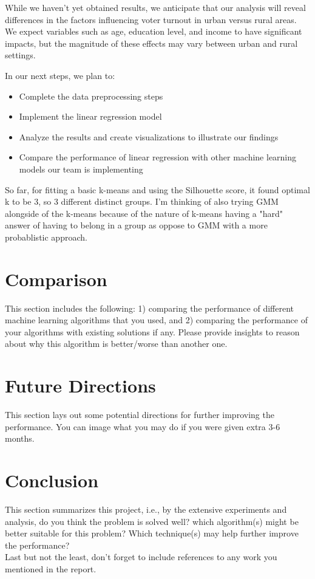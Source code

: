 \documentclass[conference]{IEEEtran}
\begin{document}
While we haven't yet obtained results, we anticipate that our analysis will reveal differences in the factors influencing voter turnout in urban versus rural areas. We expect variables such as age, education level, and income to have significant impacts, but the magnitude of these effects may vary between urban and rural settings.

In our next steps, we plan to:
\begin{itemize}
    \item Complete the data preprocessing steps
    \item Implement the linear regression model
    \item Analyze the results and create visualizations to illustrate our findings
    \item Compare the performance of linear regression with other machine learning models our team is implementing
\end{itemize}

So far, for fitting a basic k-means and using the Silhouette score, it found optimal k to be 3, so 3 different distinct groups. I'm thinking of also trying GMM alongside of the k-means because of the nature of k-means having a "hard" answer of having to belong in a group as oppose to GMM with a more probablistic approach.


\section{Comparison}  
This section includes the following: 1) comparing the performance of different machine learning algorithms that you used, and 2) comparing the performance of your algorithms with existing solutions if any. Please provide insights to reason about why this algorithm is better/worse than another one.

\section{Future Directions}
This section lays out some potential directions for further improving the performance. You can image what you may do if you were given extra 3-6 months.

\section{Conclusion}
This section summarizes this project, i.e., by the extensive experiments and analysis, do you think the problem is solved well? which algorithm(s) might be better suitable for this problem? Which technique(s) may help further improve the performance? \\

Last but not the least, don't forget to include references to any work you mentioned in the report.
  



\end{document}
